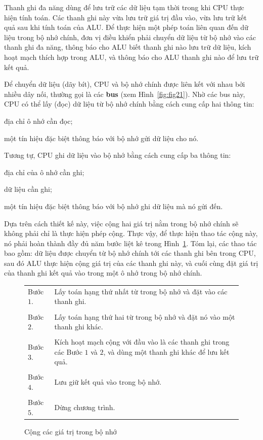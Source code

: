 Thanh ghi đa năng dùng để lưu trữ các dữ liệu tạm thời trong khi CPU thực hiện tính
toán. Các thanh ghi này vừa lưu trữ giá trị đầu vào, vừa lưu trữ kết quả sau khi tính toán
của ALU. Để thực hiện một phép toán liên quan đến dữ liệu trong bộ nhớ chính, đơn vị điều
khiển phải chuyển dữ liệu từ bộ nhớ vào các thanh ghi đa năng, thông báo cho ALU biết
thanh ghi nào lưu trữ dữ liệu, kích hoạt mạch thích hợp trong ALU, và thông báo cho ALU
thanh ghi nào để lưu trữ kết quả.      


Để chuyển dữ liệu (dãy bít), CPU và bộ nhớ chính được liên kết với nhau bởi nhiều dây nối,
thường gọi là các \textbf{bus} (xem Hình~\ref{fig:fig21}). Nhờ các bus này, CPU có thể lấy
(đọc) dữ liệu từ bộ nhớ chính bằng cách cung cấp hai thông tin: \begin{inparaenum}[(1)]
\item địa chỉ ô nhớ cần đọc;
\item một tín hiệu đặc biệt thông báo với bộ nhớ gửi dữ liệu cho nó.
\end{inparaenum}
Tương tự, CPU ghi dữ liệu vào bộ nhớ bằng cách cung cấp ba thông
tin: \begin{inparaenum}[(1)]
\item địa chỉ của ô nhớ cần ghi; 
\item dữ liệu cần ghi;
\item một tín hiệu đặc biệt thông báo với bộ nhớ ghi dữ liệu mà nó gửi đến.
\end{inparaenum}

Dựa trên cách thiết kế này, việc cộng hai giá trị nằm trong bộ nhớ chính sẽ không phải chỉ
là thực hiện phép cộng. Thực vậy, để thực hiện thao tác cộng này, nó phải hoàn thành đầy
đủ năm bước liệt kê trong Hình~\ref{fig:fig22}. Tóm lại, các thao tác bao gồm: dữ liệu được
chuyển từ bộ nhớ chính tới các thanh ghi bên trong CPU, sau đó ALU thực hiện cộng giá trị
của các thanh ghi này, và cuối cùng đặt giá trị của thanh ghi kết quả vào trong một ô nhớ
trong bộ nhớ chính.
 
\begin{figure}[tb]
  \centering
  \begin{tabular}{m{1.5cm}m{9cm}}
    Bước $1$. & Lấy toán hạng thứ nhất  từ  trong bộ nhớ và đặt vào các thanh   ghi.\\ \\

    Bước $2$. & Lấy toán hạng thứ hai  từ trong bộ nhớ và đặt nó vào một thanh ghi   khác.   \\  \\

    Bước $3$. & Kích hoạt mạch cộng với đầu vào là các thanh ghi trong các Bước $1$ và
    $2$, và dùng  một thanh ghi khác để lưu kết quả. \\ \\

    Bước $4$. & Lưu giữ kết quả vào trong bộ nhớ. \\ \\

    Bước $5$. & Dừng chương trình. 
  \end{tabular}
  \caption{Cộng các giá trị trong bộ nhớ}
  \label{fig:fig22}
\end{figure}


